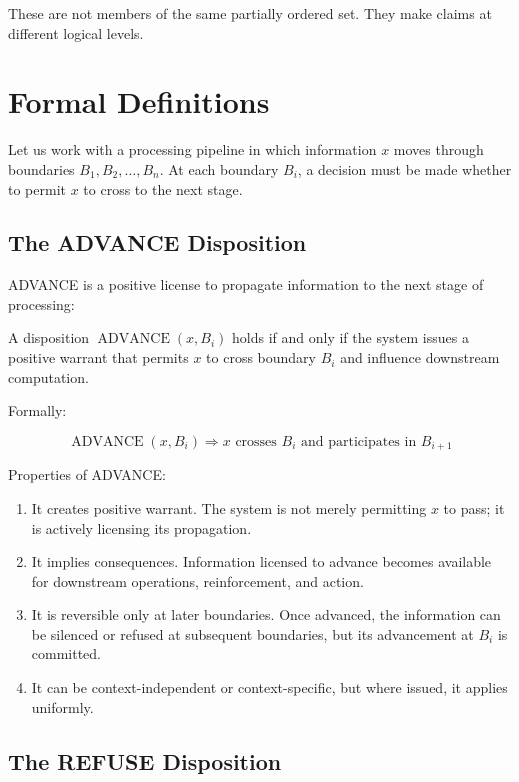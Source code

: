 \documentclass[12pt]{article}
\begin{document}
These are not members of the same partially ordered set. They make claims at different logical levels.

\section{Formal Definitions}

Let us work with a processing pipeline in which information $x$ moves through boundaries $B_1, B_2, \ldots, B_n$. At each boundary $B_i$, a decision must be made whether to permit $x$ to cross to the next stage.

\subsection{The ADVANCE Disposition}

ADVANCE is a positive license to propagate information to the next stage of processing:

\begin{definition}
A disposition $\operatorname{ADVANCE}(x, B_i)$ holds if and only if the system issues a positive warrant that permits $x$ to cross boundary $B_i$ and influence downstream computation.
\end{definition}

Formally:

\begin{equation}
\operatorname{ADVANCE}(x, B_i) \Rightarrow x \text{ crosses } B_i \text{ and participates in } B_{i+1}
\end{equation}

Properties of ADVANCE:
\begin{enumerate}
\item It creates positive warrant. The system is not merely permitting $x$ to pass; it is actively licensing its propagation.
\item It implies consequences. Information licensed to advance becomes available for downstream operations, reinforcement, and action.
\item It is reversible only at later boundaries. Once advanced, the information can be silenced or refused at subsequent boundaries, but its advancement at $B_i$ is committed.
\item It can be context-independent or context-specific, but where issued, it applies uniformly.
\end{enumerate}

\subsection{The REFUSE Disposition}
\end{document}
